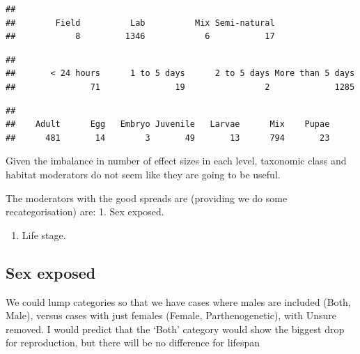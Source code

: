 \documentclass[
]{article}
\newenvironment{Shaded}{\begin{snugshade}}{\end{snugshade}}
\newcommand{\FunctionTok}[1]{\textcolor[rgb]{0.13,0.29,0.53}{\textbf{#1}}}
\newcommand{\NormalTok}[1]{#1}
\newcommand{\SpecialCharTok}[1]{\textcolor[rgb]{0.81,0.36,0.00}{\textbf{#1}}}
\providecommand{\tightlist}{%
  \setlength{\itemsep}{0pt}\setlength{\parskip}{0pt}}
\begin{document}
\begin{verbatim}
## 
##        Field          Lab          Mix Semi-natural 
##            8         1346            6           17
\end{verbatim}

\begin{Shaded}
\end{Shaded}

\begin{verbatim}
## 
##       < 24 hours      1 to 5 days      2 to 5 days More than 5 days 
##               71               19                2             1285
\end{verbatim}

\begin{Shaded}
\end{Shaded}

\begin{verbatim}
## 
##    Adult      Egg   Embryo Juvenile   Larvae      Mix    Pupae 
##      481       14        3       49       13      794       23
\end{verbatim}

Given the imbalance in number of effect sizes in each level, taxonomic
class and habitat moderators do not seem like they are going to be
useful.

The moderators with the good spreads are (providing we do some
recategorisation) are: 1. Sex exposed.

\begin{enumerate}
\def\labelenumi{\arabic{enumi}.}
\setcounter{enumi}{1}
\tightlist
\item
  Life stage.
\end{enumerate}

\hypertarget{sex-exposed}{%
\subsection{Sex exposed}\label{sex-exposed}}

We could lump categories so that we have cases where males are included
(Both, Male), versus cases with just females (Female, Parthenogenetic),
with Unsure removed. I would predict that the `Both' category would show
the biggest drop for reproduction, but there will be no difference for
lifespan
\end{document}
